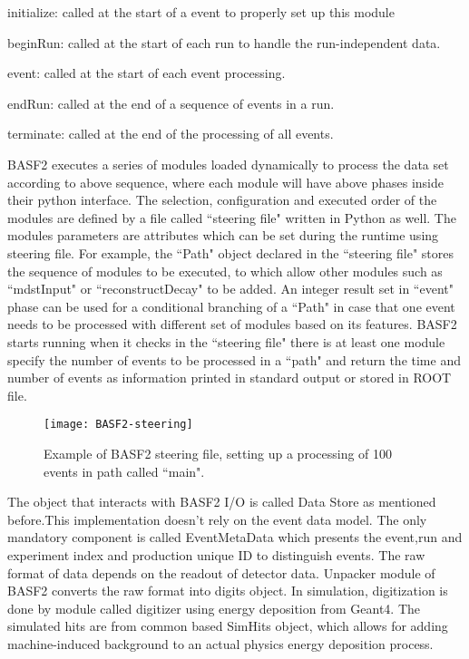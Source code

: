\textbullet \space initialize: called at the start of a event to properly set up this module

\textbullet \space beginRun: called at the start of each run to handle the run-independent data.

\textbullet \space event: called at the start of each event processing. 

\textbullet \space endRun: called at the end of a sequence of events in a run. 

\textbullet \space terminate: called at the end of the processing of all events. 

BASF2 executes a series of modules loaded dynamically to process the data set according to above sequence, where each module will have above phases inside their python interface. The selection, configuration and executed order of the modules are defined by a file called ``steering file" written in Python as well. The modules parameters are attributes which can be set during the runtime using steering file. For example, the ``Path" object declared in the ``steering file" stores the sequence of modules to be executed, to which allow other modules such as ``mdstInput" or ``reconstructDecay" to be added.
An integer result set in ``event" phase can be used for a conditional branching of a ``Path" in case that one event needs to be processed with different set of modules based on its features. BASF2 starts running when it checks in the ``steering file" there is at least one module specify the number of events to be processed in a ``path" and return the time and number of events as information printed in standard output or stored in ROOT file. 

\begin{figure}[htbp]
	\centering
	\texttt{[image: BASF2-steering]}
	\caption{ Example of BASF2 steering file, setting up a processing of 100 events in path called ``main". }
\end{figure}

The object that interacts with BASF2 I/O is called Data Store as mentioned before.This implementation doesn't rely on the event data model. The only mandatory component is called EventMetaData which presents the event,run and experiment index and production unique ID to distinguish events. The raw format of data depends on the readout of detector data. Unpacker module of BASF2 converts the raw format into digits object. In simulation, digitization is done by module called digitizer using energy deposition from Geant4. The simulated hits are from common based SimHits object, which allows for adding machine-induced background to an actual physics energy deposition process. 



